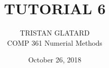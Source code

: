  

 

\title{TUTORIAL 6}%
\author{TRISTAN GLATARD\\ %
COMP 361 Numerial Methods} %
\date{October 26, 2018} 
\maketitle

